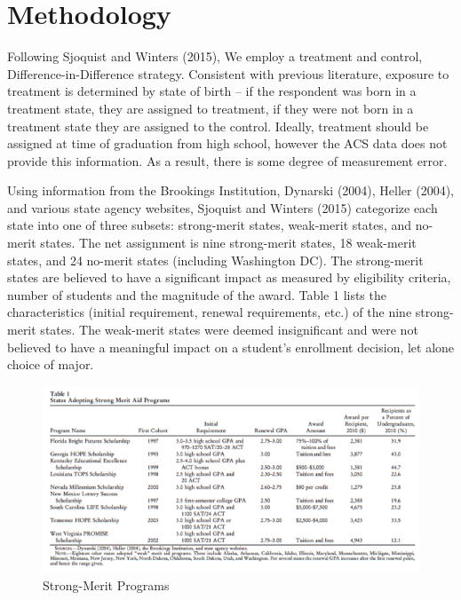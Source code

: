 \documentclass[a4paper]{article}
\begin{document}
\section{Methodology}
Following Sjoquist and Winters (2015), We employ a treatment and control, Difference-in-Difference strategy. Consistent with previous literature, exposure to treatment is determined by state of birth – if the respondent was born in a treatment state, they are assigned to treatment, if they were not born in a treatment state they are assigned to the control. Ideally, treatment should be assigned at time of graduation from high school, however the ACS data does not provide this information. As a result, there is some degree of measurement error. 

Using information from the Brookings Institution, Dynarski (2004), Heller (2004), and various state agency websites, Sjoquist and Winters (2015) categorize each state into one of three subsets: strong-merit states, weak-merit states, and no-merit states. The net assignment is nine strong-merit states, 18 weak-merit states, and 24 no-merit states (including Washington DC). The strong-merit states are believed to have a significant impact as measured by eligibility criteria, number of students and the magnitude of the award. Table 1 lists the characteristics (initial requirement, renewal requirements, etc.) of the nine strong-merit states. The weak-merit states were deemed insignificant and were not believed to have a meaningful impact on a student’s enrollment decision, let alone choice of major. 

\begin{figure}[!h]
\renewcommand{\floatpagefraction}{0.8}
\centering
\includegraphics[width=1\textwidth]{meritprograms.png}
\caption{\label{fig:meritprograms}Strong-Merit Programs}
\end{figure}
\end{document}
